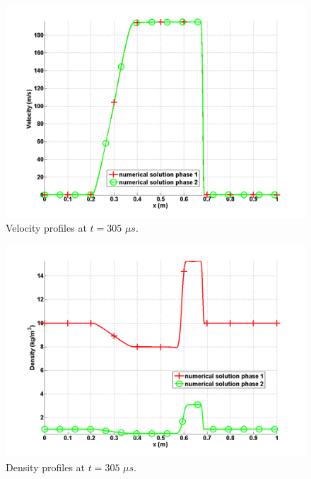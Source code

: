 \begin{figure}[H]
\centering
\includegraphics[width=\textwidth]{figures/SEM/relaxation_two_phases_velocity.png}
\caption{Velocity profiles at $t=305$ $\mu s$.}
\label{fig:two-fluids-rel-vel-7-eqn-sect4}
\end{figure}
%
\begin{figure}[H]
\centering
\includegraphics[width=\textwidth]{figures/SEM/relaxation_two_phases_density.png}
\caption{Density profiles at $t=305$ $\mu s$.}
\label{fig:two-fluids-rel-rho-7-eqn-sect4}
\end{figure}
%
